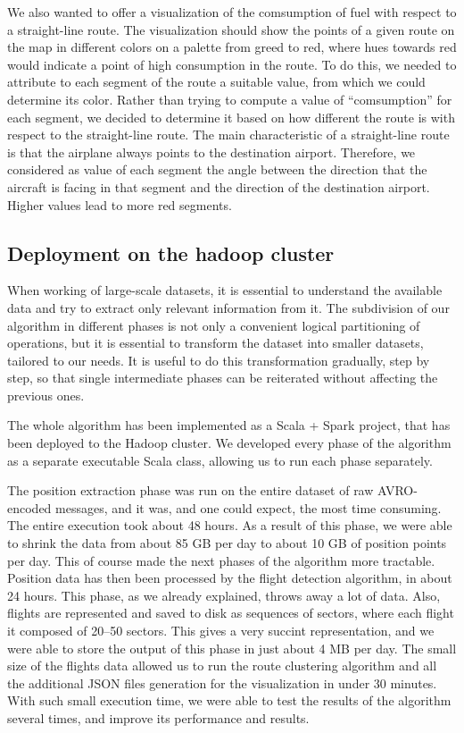 \documentclass{vldb}
\begin{document}
We also wanted to offer a visualization of the comsumption of fuel with respect
to a straight-line route. The visualization should show the points of a given
route on the map in different colors on a palette from greed to red, where hues
towards red would indicate a point of high consumption in the route.
To do this, we needed to attribute to each segment of the route a suitable value,
from which we could determine its color. Rather than trying to compute a value
of ``comsumption'' for each segment, we decided to determine it based on
how different the route is with respect to the straight-line route. The main
characteristic of a straight-line route is that the airplane always points to
the destination airport. Therefore, we considered as value of each segment the
angle between the direction that the aircraft is facing in that segment and the
direction of the destination airport. Higher values lead to more red segments.

\subsection{Deployment on the hadoop cluster}

When working of large-scale datasets, it is essential to understand the
available data and try to extract only relevant information from it. The
subdivision of our algorithm in different phases is not only a convenient
logical partitioning of operations, but it is essential to transform the dataset
into smaller datasets, tailored to our needs. It is useful to do this
transformation gradually, step by step, so that single intermediate phases can
be reiterated without affecting the previous ones.

The whole algorithm has been implemented as a Scala + Spark project, that has
been deployed to the Hadoop cluster. We developed every phase of the algorithm
as a separate executable Scala class, allowing us to run each phase separately.

The position extraction phase was run on the entire dataset of raw AVRO-encoded
messages, and it was, and one could expect, the most time consuming. The entire
execution took about 48 hours. As a result of this phase, we were able to shrink
the data from about 85 GB per day to about 10 GB of position points per day.
This of course made the next phases of the algorithm more tractable. Position
data has then been processed by the flight detection algorithm, in about 24
hours. This phase, as we already explained, throws away a lot of data. Also,
flights are represented and saved to disk as sequences of sectors, where each
flight it composed of 20--50 sectors. This gives a very succint representation,
and we were able to store the output of this phase in just about 4 MB per day.
The small size of the flights data allowed us to run the route clustering
algorithm and all the additional JSON files generation for the visualization in
under 30 minutes. With such small execution time, we were able to test the
results of the algorithm several times, and improve its performance and results.
\end{document}
